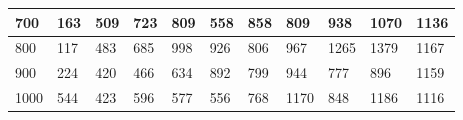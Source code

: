 \documentclass[10pt,letterpaper]{article}
\begin{document}
\begin{center}
\begin{table}
\begin{tabular} { |m{0.5cm}|m{1.3cm}|m{1.3cm}|m{1.3cm}|m{1.3cm}|m{1.3cm}|m{1.3cm}|m{1.3cm}|m{1.3cm}|m{1.3cm}|m{1.3cm}|}
\hline
\cellcolor{Gray}700 & \Large 163 & \Large 509 & \Large 723 & \Large 809 & \Large 558 & \Large 858 & \Large 809 & \Large 938 & \Large 1070 & \Large 1136 \\
\hline
\cellcolor{Gray}800 & \Large 117 & \Large 483 & \Large 685 & \Large 998 & \Large 926 & \Large 806 & \Large 967 & \Large 1265 & \Large 1379 & \Large 1167 \\
\hline
\cellcolor{Gray}900 & \Large 224 & \Large 420 & \Large 466 & \Large 634 & \Large 892 & \Large 799 & \Large 944 & \Large 777 & \Large 896 & \Large 1159 \\
\hline
\cellcolor{Gray}1000 & \Large 544 & \Large 423 & \Large 596 & \Large 577 & \Large 556 & \Large 768 & \Large 1170 & \Large 848 & \Large 1186 & \Large 1116 \\
\hline
\end{tabular} \\
\end{table}
\end{center}
\newpage 
{}
\end{document}
